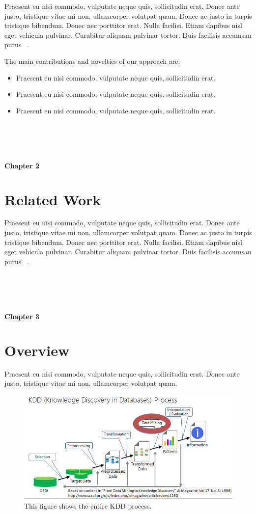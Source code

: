 \documentclass[12pt]{article}  %
\theoremstyle{plain}
\begin{document}
Praesent eu nisi commodo, vulputate neque quis, sollicitudin erat. Donec ante justo, tristique vitae mi non, ullamcorper volutpat quam. Donec ac justo in turpis tristique bibendum. Donec nec porttitor erat. Nulla facilisi. Etiam dapibus nisl eget vehicula pulvinar. Curabitur aliquam pulvinar tortor. Duis facilisis accumsan purus ~\cite{Hannon2010}.

The main contributions and novelties of our approach are:
\begin{itemize}
\item Praesent eu nisi commodo, vulputate neque quis, sollicitudin erat.
\item  Praesent eu nisi commodo, vulputate neque quis, sollicitudin erat.
\item Praesent eu nisi commodo, vulputate neque quis, sollicitudin erat.
\end{itemize}


\newpage
\noindent
\\\\\\\\
{\LARGE \bf Chapter 2}
\section{Related Work}
\label{section:relatedwork}
Praesent eu nisi commodo, vulputate neque quis, sollicitudin erat. Donec ante justo, tristique vitae mi non, ullamcorper volutpat quam. Donec ac justo in turpis tristique bibendum. Donec nec porttitor erat. Nulla facilisi. Etiam dapibus nisl eget vehicula pulvinar. Curabitur aliquam pulvinar tortor. Duis facilisis accumsan purus ~\cite{Hannon2010}.

\newpage
\noindent
\\\\\\\\
{\LARGE \bf Chapter 3}

\section{Overview}
\label{section:overview}
Praesent eu nisi commodo, vulputate neque quis, sollicitudin erat. Donec ante justo, tristique vitae mi non, ullamcorper volutpat quam. 

\begin{figure}[ht!]
\centering
\includegraphics[scale=.60]{images/kdd}
\caption{This figure shows the entire KDD process.}
\label{framework}
\end{figure}
\end{document}
